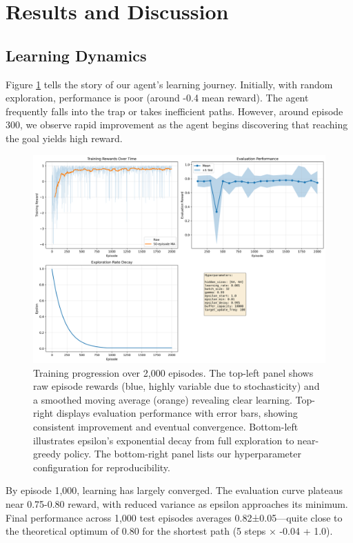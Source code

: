 \documentclass[conference]{IEEEtran}
\begin{document}
\section{Results and Discussion}

\subsection{Learning Dynamics}

Figure \ref{fig:training} tells the story of our agent's learning journey. Initially, with random exploration, performance is poor (around -0.4 mean reward). The agent frequently falls into the trap or takes inefficient paths. However, around episode 300, we observe rapid improvement as the agent begins discovering that reaching the goal yields high reward.

\begin{figure}[htbp]
\centerline{\includegraphics[width=\columnwidth]{images/gridworld_dqn_results.png}}
\caption{Training progression over 2,000 episodes. The top-left panel shows raw episode rewards (blue, highly variable due to stochasticity) and a smoothed moving average (orange) revealing clear learning. Top-right displays evaluation performance with error bars, showing consistent improvement and eventual convergence. Bottom-left illustrates epsilon's exponential decay from full exploration to near-greedy policy. The bottom-right panel lists our hyperparameter configuration for reproducibility.}
\label{fig:training}
\end{figure}

By episode 1,000, learning has largely converged. The evaluation curve plateaus near 0.75-0.80 reward, with reduced variance as epsilon approaches its minimum. Final performance across 1,000 test episodes averages 0.82±0.05—quite close to the theoretical optimum of 0.80 for the shortest path (5 steps × -0.04 + 1.0).
\end{document}
